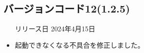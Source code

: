 \subsection*{バージョンコード12(1.2.5)}
\begin{itemize}
    \item[リリース日] 2024年4月15日
\end{itemize}

\new \par
\change \par
\fix
\begin{itemize}
    \item 起動できなくなる不具合を修正しました。
\end{itemize}

